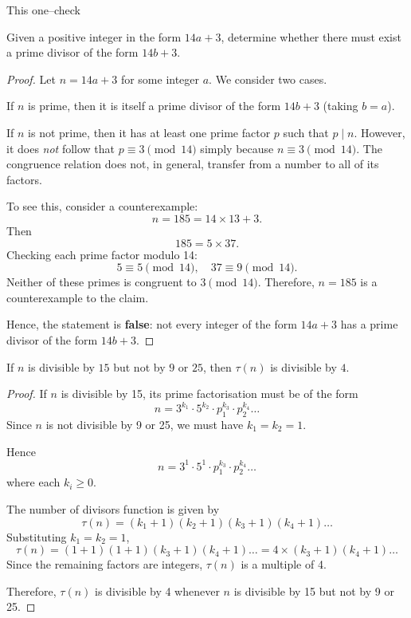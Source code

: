 \documentclass{tufte-handout}
\begin{document}
This one--check
\begin{question}

Given a positive integer in the form \( 14a + 3 \), determine whether there must exist 
a prime divisor of the form \( 14b + 3 \).

\begin{proof}
Let \( n = 14a + 3 \) for some integer \( a \). We consider two cases.

If \( n \) is prime, then it is itself a prime divisor of the form \( 14b + 3 \) 
(taking \( b = a \)).

If \( n \) is not prime, then it has at least one prime factor \( p \) such that \( p \mid n \).  
However, it does \emph{not} follow that \( p \equiv 3 \pmod{14} \) simply because 
\( n \equiv 3 \pmod{14} \). The congruence relation does not, in general, transfer 
from a number to all of its factors.

To see this, consider a counterexample:
\[
n = 185 = 14 \times 13 + 3.
\]
Then
\[
185 = 5 \times 37.
\]
Checking each prime factor modulo 14:
\[
5 \equiv 5 \pmod{14}, \quad 37 \equiv 9 \pmod{14}.
\]
Neither of these primes is congruent to \(3 \pmod{14}\).  
Therefore, \( n = 185 \) is a counterexample to the claim.

Hence, the statement is \textbf{false}:  
not every integer of the form \( 14a + 3 \) has a prime divisor of the form \( 14b + 3 \).

\end{proof}

\end{question}


\begin{question}

If \( n \) is divisible by \( 15 \) but not by \( 9 \text{ or } 25 \), then \( \tau(n) \)
is divisible by \( 4 \).

\begin{proof}
If \( n \) is divisible by 15, its prime factorisation must be of the form
\[
n = 3^{k_1} \cdot 5^{k_2} \cdot p_1^{k_3} \cdot p_2^{k_4} \ldots
\]
Since \( n \) is not divisible by 9 or 25, we must have \( k_1 = k_2 = 1 \).

Hence
\[
n = 3^1 \cdot 5^1 \cdot p_1^{k_3} \cdot p_2^{k_4} \ldots
\]
where each \( k_i \geq 0 \).

The number of divisors function is given by
\[
\tau(n) = (k_1 + 1)(k_2 + 1)(k_3 + 1)(k_4 + 1)\ldots
\]
Substituting \( k_1 = k_2 = 1 \),
\[
\tau(n) = (1 + 1)(1 + 1)(k_3 + 1)(k_4 + 1)\ldots = 4 \times (k_3 + 1)(k_4 + 1)\ldots
\]
Since the remaining factors are integers, \( \tau(n) \) is a multiple of 4.

Therefore, \( \tau(n) \) is divisible by 4 whenever \( n \) is divisible by 15 but not by 9 or 25.

\end{proof}

\end{question}
\end{document}
